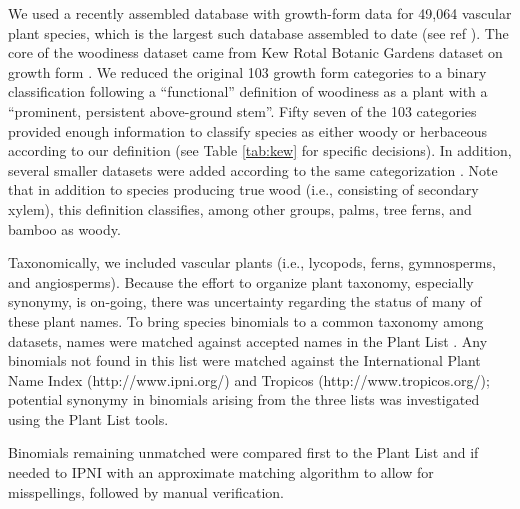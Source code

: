 \documentclass[12pt]{article}
\begin{document}
% 

We used a recently assembled database with growth-form data for 49,064
vascular plant species, which is the largest such database assembled
to date (see ref \citep{Zanne}). The core of the woodiness dataset
came from Kew Rotal Botanic Gardens dataset on growth form
\citep{Kew}.  We reduced the original 103 growth form categories to a
binary classification following a ``functional'' definition of
woodiness as a plant with a ``prominent, persistent above-ground
stem''.  Fifty seven of the 103 categories provided enough information
to classify species as either woody or herbaceous according to our
definition (see Table \ref{tab:kew} for specific decisions).  In
addition, several smaller datasets were added according to the same
categorization \citep{Zanne}.  Note that in addition to species
producing true wood (i.e., consisting of secondary xylem), this
definition classifies, among other groups, palms, tree ferns, and
bamboo as woody.

Taxonomically, we included vascular plants (i.e., lycopods, ferns,
gymnosperms, and angiosperms).
%
Because the effort to organize plant taxonomy, especially synonymy, is
on-going, there was uncertainty regarding the status of many of these
plant names.  
%
To bring species binomials to a common taxonomy among datasets, names
were matched against accepted names in the Plant List
\citep{ThePlantList}.  Any binomials not found in this list were
matched against the International Plant Name Index
(http://www.ipni.org/) and Tropicos (http://www.tropicos.org/);
potential synonymy in binomials arising from the three lists was
investigated using the Plant List tools.  

Binomials remaining unmatched were compared first to the Plant List
and if needed to IPNI with an approximate matching algorithm to allow
for misspellings, followed by manual verification.
\end{document}

